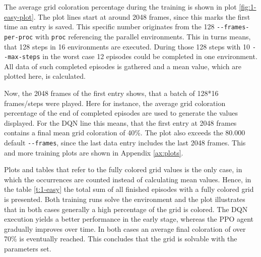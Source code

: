 The average grid coloration percentage during the training is shown in plot \ref{fig:1-easy-plot}. The plot lines start at around 2048 frames, since this marks the first time an entry is saved. This specific number originates from the 128 \verb|--frames-per-proc| with \verb|proc| referencing the parallel environments. This in turns means, that 128 steps in 16 environments are executed. During those 128 steps with 10 \verb|--max-steps| in the worst case 12 episodes could be completed in one environment. All data of such completed episodes is gathered and a mean value, which are plotted here, is calculated. 

Now, the 2048 frames of the first entry shows, that a batch of 128*16 frames/steps were played. Here for instance, the average grid coloration percentage of the end of completed episodes are used to generate the values displayed. For the DQN line this means, that the first entry at 2048 frames contains a final mean grid coloration of 40\%. The plot also exceeds the 80.000 default \verb|--frames|, since the last data entry includes the last 2048 frames. This and more training plots are shown in Appendix \ref{ax:plots}.



Plots and tables that refer to the fully colored grid values is the only case, in which the occurrences are counted instead of calculating mean values. 
Hence, in the table \ref{t:1-easy} the total sum of all finished episodes with a fully colored grid is presented.
Both training runs solve the environment and the plot illustrates that in both cases generally a high percentage of the grid is colored. The DQN execution yields a better performance in the early stage, whereas the PPO agent gradually improves over time. In both cases an average final coloration of over 70\% is eventually reached. This concludes that the grid is solvable with the parameters set.

